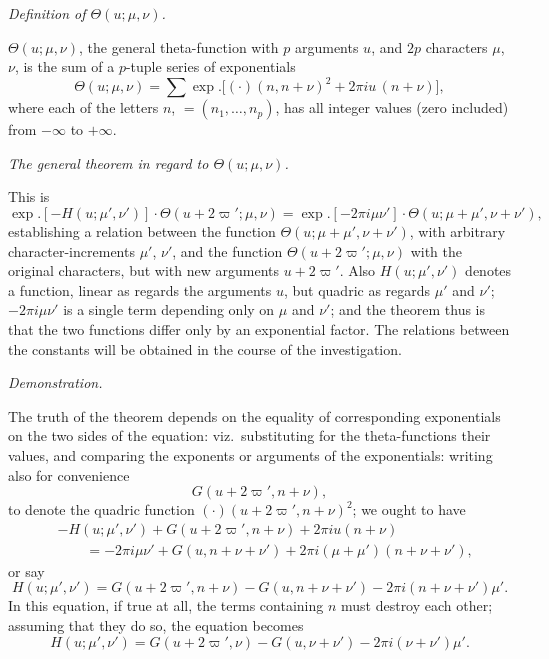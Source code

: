 \documentclass[11pt,a4paper]{article}
\begin{document}
\bigskip

\begin{center}
\textit{Definition of $\Theta(u; \mu, \nu)$.}
\end{center}

\noindent
$\Theta(u; \mu, \nu)$, the general theta-function with $p$ arguments $u$,
and $2p$ characters $\mu$, $\nu$, is the sum of a $p$-tuple series of
exponentials
\[
  \Theta(u; \mu, \nu) = \sum \exp.\bigl[(\cdot)(n, n + \nu)^{2}
       + 2\pi i u\,(n + \nu)\bigr],
\]
where each of the letters $n$, $= (n_{1}, \ldots, n_{p})$, has all integer
values (zero included) from $-\infty$ to $+\infty$.

\bigskip

\begin{center}
\textit{The general theorem in regard to $\Theta(u; \mu, \nu)$.}
\end{center}

\noindent This is
\[
  \exp.[-H(u; \mu', \nu')] \cdot \Theta(u + 2\varpi'; \mu, \nu)
   = \exp.[-2\pi i \mu \nu'] \cdot \Theta(u; \mu + \mu', \nu + \nu'),
\]
establishing a relation between the function
$\Theta(u; \mu + \mu', \nu + \nu')$, with arbitrary character-increments
$\mu'$, $\nu'$, and the function $\Theta(u + 2\varpi'; \mu, \nu)$ with the
original characters, but with new arguments $u + 2\varpi'$.  Also
$H(u; \mu', \nu')$ denotes a function, linear as regards the arguments $u$,
but quadric as regards $\mu'$ and $\nu'$; $-2\pi i \mu \nu'$ is a single
term depending only on $\mu$ and $\nu'$; and the theorem thus is that the
two functions differ only by an exponential factor.  The relations between
the constants will be obtained in the course of the investigation.

\begin{center}
\textit{Demonstration.}
\end{center}

\noindent
The truth of the theorem depends on the equality of corresponding
exponentials on the two sides of the equation: viz.\ substituting for the
theta-functions their values, and comparing the exponents or arguments of
the exponentials: writing also for convenience
\[
  G(u + 2\varpi', n + \nu),
\]
to denote the quadric function $(\cdot)(u + 2\varpi', n + \nu)^{2}$; we
ought to have
\begin{align*}
  & -H(u; \mu', \nu') + G(u + 2\varpi', n + \nu) + 2\pi i u (n + \nu) \\
  & \qquad = -2\pi i \mu \nu' + G(u, n + \nu + \nu')
            + 2\pi i (\mu + \mu')(n + \nu + \nu'),
\end{align*}
or say
\[
  H(u; \mu', \nu') = G(u + 2\varpi', n + \nu) - G(u, n + \nu + \nu')
   - 2\pi i (n + \nu + \nu') \mu'.
\]
In this equation, if true at all, the terms containing $n$ must destroy each
other; assuming that they do so, the equation becomes
\[
  H(u; \mu', \nu') = G(u + 2\varpi', \nu) - G(u, \nu + \nu')
   - 2\pi i (\nu + \nu') \mu'.
\]
\end{document}
